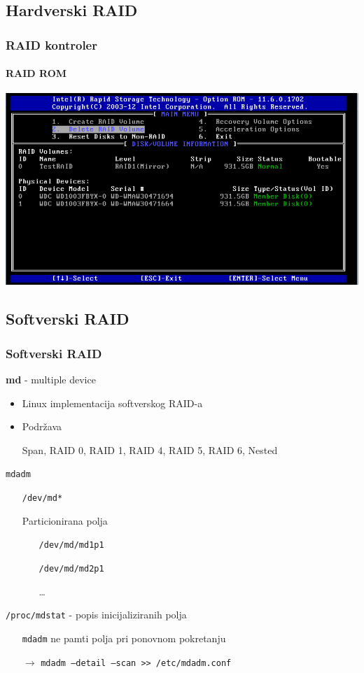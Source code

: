 \documentclass[t]{beamer}
\begin{document}
\subsection{Hardverski RAID}
\begin{frame}
	\frametitle{RAID kontroler}
	\framesubtitle{RAID ROM}
	\includegraphics[width=\textwidth]{Intel_RAID.png}
\end{frame}

\subsection{Softverski RAID}
\begin{frame}
	\frametitle{Softverski RAID}
	\textbf{md} - multiple device
	\begin{itemize}
		\item Linux implementacija softverskog RAID-a
		\item Podržava
		\item[] Span, RAID 0, RAID 1, RAID 4, RAID 5, RAID 6, Nested
	\end{itemize}

	\texttt{mdadm}
	\begin{itemize}
		\item[] \texttt{/dev/md*}
		\item[] Particionirana polja
		\begin{itemize}
			\item[] \texttt{/dev/md/md1p1}
			\item[] \texttt{/dev/md/md2p1}
			\item[] \dots
		\end{itemize}
	\end{itemize}
	
	\texttt{/proc/mdstat} - popis inicijaliziranih polja\\
	\begin{itemize}
		\item[] \texttt{mdadm} ne pamti polja pri ponovnom pokretanju
		\item[$\rightarrow$] \texttt{mdadm --detail --scan >> /etc/mdadm.conf}
	\end{itemize}
\end{frame}
\end{document}

